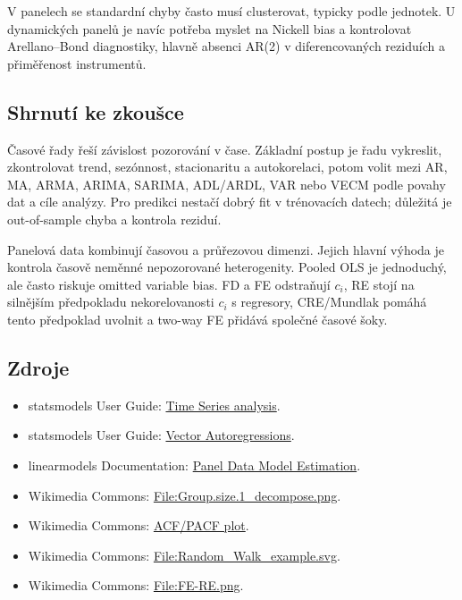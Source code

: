 V panelech se standardní chyby často musí clusterovat, typicky podle jednotek. U dynamických panelů je
navíc potřeba myslet na Nickell bias a kontrolovat Arellano--Bond diagnostiky, hlavně absenci AR(2) v
diferencovaných reziduích a přiměřenost instrumentů.

\subsection{Shrnutí ke zkoušce}

Časové řady řeší závislost pozorování v čase. Základní postup je řadu vykreslit, zkontrolovat trend,
sezónnost, stacionaritu a autokorelaci, potom volit mezi AR, MA, ARMA, ARIMA, SARIMA, ADL/ARDL,
VAR nebo VECM podle povahy dat a cíle analýzy. Pro predikci nestačí dobrý fit v trénovacích datech;
důležitá je out-of-sample chyba a kontrola reziduí.

Panelová data kombinují časovou a průřezovou dimenzi. Jejich hlavní výhoda je kontrola časově neměnné
nepozorované heterogenity. Pooled OLS je jednoduchý, ale často riskuje omitted variable bias. FD a FE
odstraňují $c_i$, RE stojí na silnějším předpokladu nekorelovanosti $c_i$ s regresory, CRE/Mundlak
pomáhá tento předpoklad uvolnit a two-way FE přidává společné časové šoky.

\subsection{Zdroje}
\begin{itemize}
    \item statsmodels User Guide:
    \href{https://www.statsmodels.org/stable/tsa.html}{Time Series analysis}.
    \item statsmodels User Guide:
    \href{https://www.statsmodels.org/stable/vector\_ar.html}{Vector Autoregressions}.
    \item linearmodels Documentation:
    \href{https://bashtage.github.io/linearmodels/panel/examples/examples.html}{Panel Data Model Estimation}.
    \item Wikimedia Commons:
    \href{https://commons.wikimedia.org/wiki/File:Group.size.1\_decompose.png}{File:Group.size.1\_decompose.png}.
    \item Wikimedia Commons:
    \href{https://commons.wikimedia.org/wiki/File:Autocorrelation\_Function\_vs.\_Partial\_Autocorrelation\_Function.png}{ACF/PACF plot}.
    \item Wikimedia Commons:
    \href{https://commons.wikimedia.org/wiki/File:Random\_Walk\_example.svg}{File:Random\_Walk\_example.svg}.
    \item Wikimedia Commons:
    \href{https://commons.wikimedia.org/wiki/File:FE-RE.png}{File:FE-RE.png}.
\end{itemize}

\newpage
